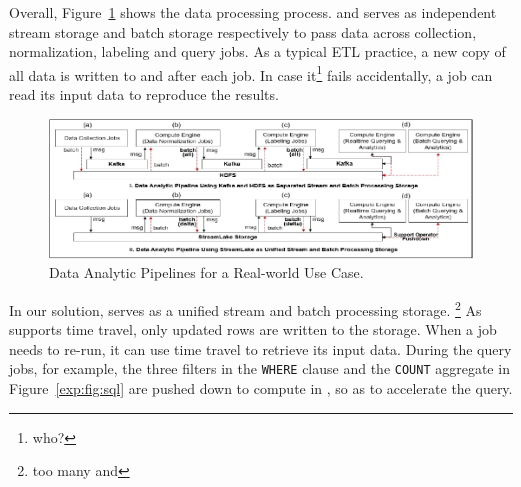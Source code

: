 Overall, Figure~\ref{exp:fig:case} shows the data processing process.  \kafka and \hdfs serves as independent stream storage and batch storage respectively to pass data across collection, normalization, labeling and query jobs.
 As a typical ETL practice, a new copy of all data is written to \hdfs and \kafka after each job. In case it\footnote{who?} fails accidentally, a job can read its input data to reproduce the results.
 
 
 \begin{figure}[htbp]
 	\includegraphics[scale=1.05]{figures/case}
 	\centering
 	\vspace{-1em}
 	\caption{Data Analytic Pipelines for a  Real-world Use Case.}
 	\label{exp:fig:case}
 \end{figure}
 
  In our solution, \sys serves as a unified stream and batch processing storage. \footnote{too many and} 
  As \sys supports time travel, only updated rows are written to the storage. When a job needs to re-run, it can use time travel to retrieve its input data.  During the query jobs, for example, the three filters in the \texttt{WHERE} clause and the \texttt{COUNT} aggregate in Figure~\ref{exp:fig:sql} are pushed down to compute in \sys, so as to  accelerate the query.


